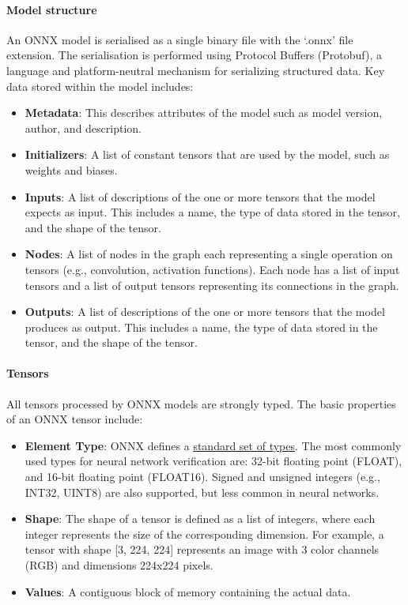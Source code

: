\paragraph{Model structure} 

An ONNX model is serialised as a single binary file with the `.onnx' file extension. The serialisation is performed using Protocol Buffers (Protobuf), a language and platform-neutral mechanism for serializing structured data. Key data stored within the model includes:
\begin{itemize}
	\item \textbf{Metadata}: This describes attributes of the model such as model version, author, and description.
	\item \textbf{Initializers}: A list of constant tensors that are used by the model, such as weights and biases.
	\item \textbf{Inputs}: A list of descriptions of the one or more tensors that the model expects as input. This includes a name, the type of data stored in the tensor, and the shape of the tensor.
	\item \textbf{Nodes}: A list of nodes in the graph each representing a single operation on  tensors (e.g., convolution, activation functions). Each node has a list of input tensors and a list of output tensors representing its connections in the graph.
	\item \textbf{Outputs}: A list of descriptions of the one or more tensors that the model produces as output. This includes a name, the type of data stored in the tensor, and the shape of the tensor.
\end{itemize}


\paragraph{Tensors}
All tensors processed by ONNX models are strongly typed. The basic properties of an ONNX tensor include:
\begin{itemize}
	\item \textbf{Element Type}: ONNX defines a \href{https://onnx.ai/onnx/intro/concepts.html#element-type}{standard set of types}. 
	The most commonly used types for neural network verification are: 32-bit floating point (FLOAT), and 16-bit floating point (FLOAT16). Signed and unsigned integers (e.g., INT32, UINT8) are also supported, 
	but less common in neural networks.
	\item \textbf{Shape}: The shape of a tensor is defined as a list of integers, where each integer represents the size of the corresponding dimension. For example, a tensor with shape [3, 224, 224] 
	represents an image with 3 color channels (RGB) and dimensions 224x224 pixels.
	\item \textbf{Values}: A contiguous block of memory containing the actual data.
\end{itemize}

